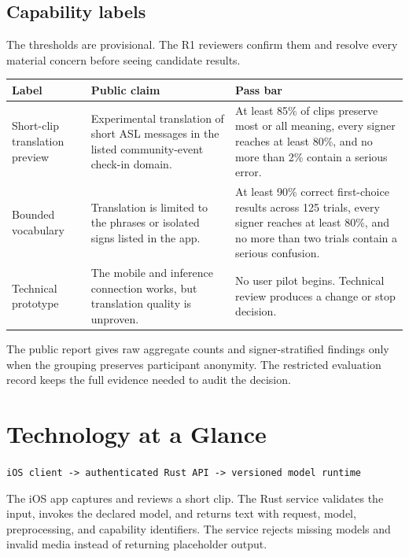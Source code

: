 \documentclass[11pt]{article}
\newcommand{\code}[1]{\texttt{#1}}
\begin{document}
\subsection{Capability labels}

The thresholds are provisional. The R1 reviewers confirm them and resolve every
material concern before seeing candidate results.

\begin{center}
\begin{tabularx}{\textwidth}{@{}P{3.0cm}YY@{}}
\toprule
Label & Public claim & Pass bar \\
\midrule
Short-clip translation preview & Experimental translation of short ASL messages in
the listed community-event check-in domain. & At least 85\% of clips preserve most or
all meaning, every signer reaches at least 80\%, and no more than 2\% contain a serious
error. \\
Bounded vocabulary & Translation is limited to the phrases or isolated signs listed
in the app. & At least 90\% correct first-choice results across 125 trials, every
signer reaches at least 80\%, and no more than two trials contain a serious confusion.
\\
Technical prototype & The mobile and inference connection works, but translation
quality is unproven. & No user pilot begins. Technical review produces a change or stop
decision. \\
\bottomrule
\end{tabularx}
\end{center}

The public report gives raw aggregate counts and signer-stratified findings only when
the grouping preserves participant anonymity. The restricted evaluation record keeps
the full evidence needed to audit the decision.

\section{Technology at a Glance}

\begin{center}
\code{iOS client -> authenticated Rust API -> versioned model runtime}
\end{center}

The iOS app captures and reviews a short clip. The Rust service validates the input,
invokes the declared model, and returns text with request, model, preprocessing, and
capability identifiers. The service rejects missing models and invalid media instead
of returning placeholder output.
\end{document}
